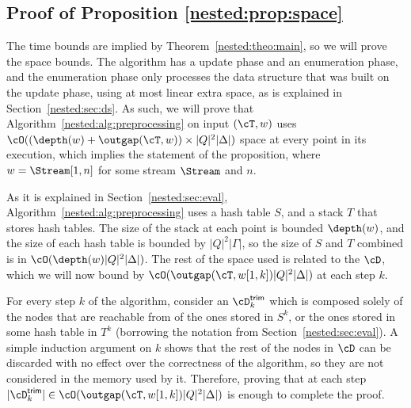 \subsection{Proof of Proposition  \ref{nested:prop:space}}

The time bounds are implied by Theorem~\ref{nested:theo:main}, so we will prove the space bounds. The algorithm has a update phase and an enumeration phase, and the enumeration phase only processes the data structure that was built on the update phase, using at most linear extra space, as is explained in Section~\ref{nested:sec:ds}. As such, we will prove that Algorithm~\ref{nested:alg:preprocessing} on input $(\cT, w)$ uses $\cO((\depth(w) + \outgap(\cT,w))\times|Q|^2|\Delta|)$ space at every point in its execution, which implies the statement of the proposition, where $w = \Stream[1,n]$ for some stream $\Stream$ and $n$.

As it is explained in Section~\ref{nested:sec:eval}, Algorithm~\ref{nested:alg:preprocessing} uses a hash table $S$, and a stack $T$ that stores hash tables. The size of the stack at each point is bounded $\depth(w)$, and the size of each hash table is bounded by $|Q|^2|\Gamma|$, so the size of $S$ and $T$ combined is in $\cO(\depth(w)|Q|^2|\Delta|)$. The rest of the space used is related to the \dsepsabbr $\cD$, which we will now bound by $\cO(\outgap(\cT,w[1,k])|Q|^2|\Delta|)$ at each step $k$.

For every step $k$ of the algorithm, consider an \dsepsabbr $\cD^{\textsf{trim}}_k$ which is composed solely of the nodes that are reachable from of the ones stored in $S^k$, or the ones stored in some hash table in $T^k$ (borrowing the notation from Section~\ref{nested:sec:eval}). A simple induction argument on $k$ shows that the rest of the nodes in $\cD$ can be discarded with no effect over the correctness of the algorithm, so they are not considered in the memory used by it. Therefore, proving that at each step $| \cD^{\textsf{trim}}_k | \in \cO(\outgap(\cT,w[1,k])|Q|^2|\Delta|)$ is enough to complete the proof. 


